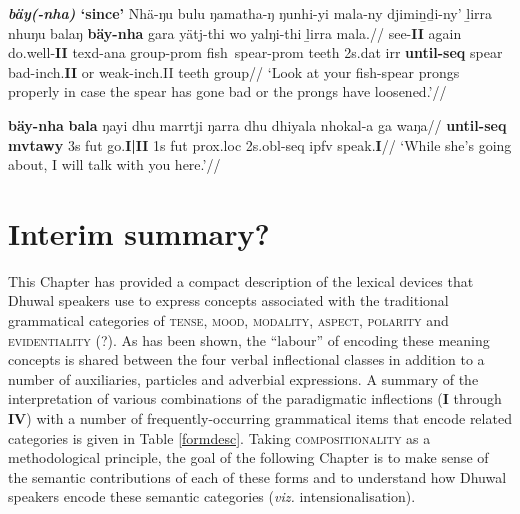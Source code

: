\pex \textbf{\textit{bäy(-nha)} `since'}
\a{}\begingl\gla Nhä-ŋu bulu ŋamatha-ŋ ŋunhi-yi mala-ny djimiṉḏi-ny' ḻirra nhuŋu balaŋ \textbf{bäy-nha} gara yätj-thi wo yalŋi-thi ḻirra mala.//
\glb see-\textbf{II} again do.well-\textbf{II} \gls{texd}-\gls{ana} group-\gls{prom} fish~spear-\gls{prom} teeth 2s.\gls{dat} \gls{irr} \textbf{until-\gls{seq}} spear bad-\gls{inch}.\textbf{II} or weak-\gls{inch}.II teeth group//
\glft`Look at your fish-spear prongs properly in case the spear has gone bad or the prongs have loosened.'//\endgl

\a{}\begingl\gla \textbf{bäy-nha} \textbf{bala} ŋayi dhu marrtji ŋarra dhu dhiyala nhokal-a ga waŋa//
\glb \textbf{until-\gls{seq}} \textbf{\gls{mvtawy}} 3s \gls{fut} go.\textbf{I|II} 1s \gls{fut} \gls{prox}.\gls{loc} 2s.\gls{obl}-\gls{seq} \gls{ipfv} speak.\textbf{I}//
\glft`While she's going about, I will talk with you here.'//\endgl

\xe


\section{Interim summary?}

This Chapter has provided a compact description of the lexical devices that Dhuwal speakers use to express concepts associated with the traditional grammatical categories of \textsc{tense, mood, modality, aspect, polarity} and \textsc{evidentiality} (?). As has been shown, the ``labour'' of encoding these meaning concepts is shared between the four verbal inflectional classes in addition to a number of auxiliaries, particles and adverbial expressions. A summary of the interpretation of various combinations of the paradigmatic inflections (\textbf{I} through \textbf{IV}) with a number of frequently-occurring grammatical items that encode related categories is given in Table \ref{formdesc}. Taking \textsc{compositionality} as a methodological principle, the goal of the following Chapter is to make sense of the semantic contributions of each of these forms and to understand how Dhuwal speakers encode these semantic categories (\textit{viz.} intensionalisation).


